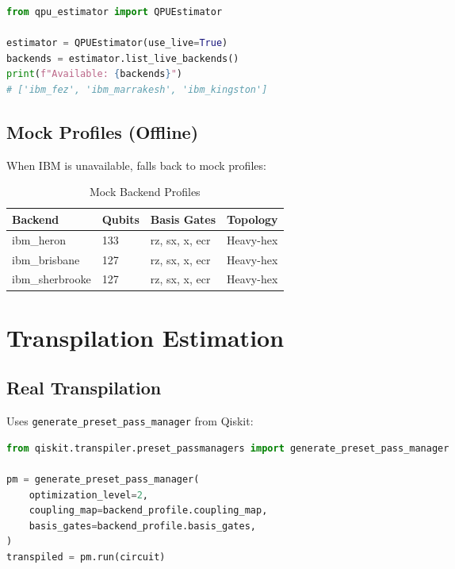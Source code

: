 \documentclass[11pt,a4paper]{article}
\begin{document}
\begin{lstlisting}[language=Python,caption=Live Backend Profiling]
from qpu_estimator import QPUEstimator

estimator = QPUEstimator(use_live=True)
backends = estimator.list_live_backends()
print(f"Available: {backends}")
# ['ibm_fez', 'ibm_marrakesh', 'ibm_kingston']
\end{lstlisting}

\subsection{Mock Profiles (Offline)}

When IBM is unavailable, falls back to mock profiles:

\begin{table}[htbp]
\centering
\caption{Mock Backend Profiles}
\begin{tabular}{@{}llll@{}}
\toprule
\textbf{Backend} & \textbf{Qubits} & \textbf{Basis Gates} & \textbf{Topology} \\
\midrule
ibm\_heron & 133 & rz, sx, x, ecr & Heavy-hex \\
ibm\_brisbane & 127 & rz, sx, x, ecr & Heavy-hex \\
ibm\_sherbrooke & 127 & rz, sx, x, ecr & Heavy-hex \\
\bottomrule
\end{tabular}
\end{table}

\section{Transpilation Estimation}

\subsection{Real Transpilation}

Uses \texttt{generate\_preset\_pass\_manager} from Qiskit:

\begin{lstlisting}[language=Python,caption=Real Transpilation]
from qiskit.transpiler.preset_passmanagers import generate_preset_pass_manager

pm = generate_preset_pass_manager(
    optimization_level=2,
    coupling_map=backend_profile.coupling_map,
    basis_gates=backend_profile.basis_gates,
)
transpiled = pm.run(circuit)
\end{lstlisting}
\end{document}
